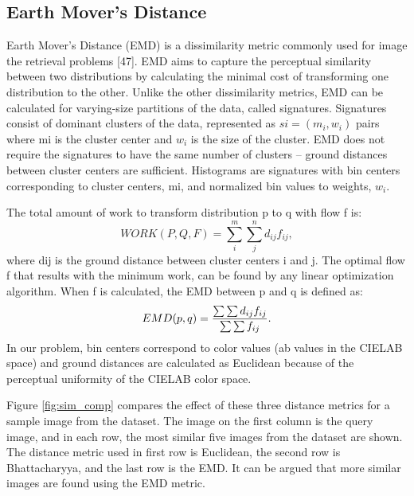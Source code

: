 \subsection{Earth Mover’s Distance}
Earth Mover’s Distance (EMD) is a dissimilarity metric commonly used for image the retrieval problems [47]. EMD aims to capture the perceptual similarity between two distributions by calculating the minimal cost of transforming one distribution to the other. Unlike the other dissimilarity metrics, EMD can be calculated for varying-size partitions of the data, called signatures.
Signatures consist of dominant clusters of the data, represented as $si = (m_i, w_i)$ pairs where mi is the cluster center and $w_i$ is the size of the cluster. EMD does not require the signatures to have the same number of clusters – ground distances between cluster centers are sufficient. Histograms are signatures with bin centers corresponding to cluster centers, mi, and normalized bin values to weights, $w_i$.

The total amount of work to transform distribution
p to q with flow f is:
\begin{equation}
WORK(P,Q,F) = \sum_i^m \sum_j^n d_{ij}f_{ij}, 
\end{equation}
where dij is the ground distance between cluster centers i and j. The optimal flow f that results with the minimum work, can be found by any linear optimization algorithm. When f is calculated, the EMD between p and q is defined as:
\begin{equation}
EMD(p,q) = {{\sum \sum d_{ij}f_{ij}}\over{\sum \sum f_{ij}}}.
\end{equation}
In our problem, bin centers correspond to color values
(ab values in the CIELAB space) and ground distances
are calculated as Euclidean because of the perceptual
uniformity of the CIELAB color space.

Figure \ref{fig:sim_comp} compares the effect of these three distance
metrics for a sample image from the dataset. The image
on the first column is the query image, and in each row,
the most similar five images from the dataset are shown.
The distance metric used in first row is Euclidean, the
second row is Bhattacharyya, and the last row is the
EMD. It can be argued that more similar images are
found using the EMD metric.

